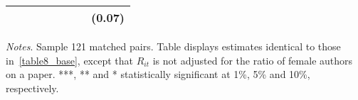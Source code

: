 \begin{table}[H]
\begin{threeparttable}
\begin{tabular}{p{3cm}S[table-format=3.3]@{}S[table-format=3.3]@{}S[table-format=3.2]@{}S[table-format=4.3]@{}S[table-format=3.3]@{}S[table-format=3.1]@{}S@{}}
                                          &            &            &            &            &            &            &      (0.07)   \\
            \bottomrule
        \end{tabular}
        \begin{tablenotes}
            \tiny
            \item \textit{Notes}. Sample 121 matched pairs. Table displays estimates identical to those in~\autoref{table8_base}, except that \(R_{it}\) is not adjusted for the ratio of female authors on a paper. ***, ** and * statistically significant at 1\%, 5\% and 10\%, respectively.
        \end{tablenotes}
    \end{threeparttable}
\end{table}